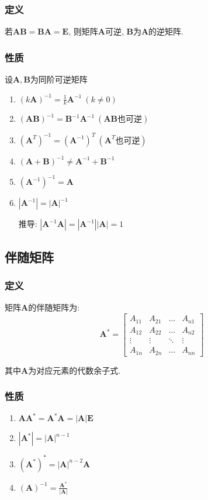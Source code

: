 \subsubsection{定义}
若$ \bm{A}\bm{B}=\bm{B}\bm{A}=\bm{E} $, 则矩阵$ \bm{A} $可逆, $ \bm{B} $为$ \bm{A} $的逆矩阵.
\subsubsection{性质}
设$ \bm{A}, \bm{B} $为同阶可逆矩阵
\begin{enumerate}
\item $ (k\bm{A})^{-1}=\frac{1}{k}\bm{A}^{-1}\ (k\neq 0) $
\item $ (\bm{A}\bm{B})^{-1}=\bm{B}^{-1}\bm{A}^{-1}\ (\bm{A}\bm{B}\text{也可逆}) $
\item $ (\bm{A}^{T})^{-1}=(\bm{A}^{-1})^{T}\ (\bm{A}^{T}\text{也可逆}) $
\item $ (\bm{A}+\bm{B})^{-1}\neq \bm{A}^{-1}+\bm{B}^{-1} $
\item $ (\bm{A}^{-1})^{-1}=\bm{A} $
\item $ |\bm{A}^{-1}|=|\bm{A}|^{-1} $ \par
推导: $|\bm{A}^{-1}\bm{A}|=|\bm{A}^{-1}||\bm{A}|=1$
\end{enumerate}
\subsection{伴随矩阵}
\subsubsection{定义}
矩阵$ \bm{A} $的伴随矩阵为:
\begin{equation*}
\bm{A}^{*}=
\begin{bmatrix}
A_{11}	& A_{21} & \dots & A_{n1} \\
A_{12}	& A_{22} & \dots & A_{n2} \\
\vdots	& \vdots & \ddots & \vdots \\
A_{1n}	& A_{2n} & \dots & A_{nn}
\end{bmatrix}
\end{equation*}\par
其中$ \bm{A} $为对应元素的代数余子式.
\subsubsection{性质}
\begin{enumerate}
\item $ \bm{A}\bm{A}^{*}=\bm{A}^{*}\bm{A}=|\bm{A}|\bm{E} $
\item $ |\bm{A}^{*}|=|\bm{A}|^{n-1} $
\item $ (\bm{A}^{*})^{*}=|\bm{A}|^{n-2}\bm{A} $
\item $ (\bm{A})^{-1}=\frac{\bm{A}^{*}}{|\bm{A}|} $
\end{enumerate}
